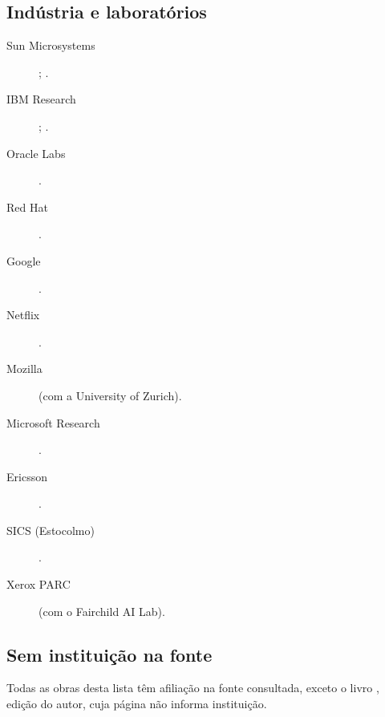 \subsection{Indústria e laboratórios}
\begin{description}
\item[Sun Microsystems] ;
  .
\item[IBM Research] ;
  .
\item[Oracle Labs] .
\item[Red Hat] .
\item[Google] .
\item[Netflix] .
\item[Mozilla]  (com a
  University of Zurich).
\item[Microsoft Research] .
\item[Ericsson] .
\item[SICS (Estocolmo)] .
\item[Xerox PARC]  (com o
  Fairchild AI Lab).
\end{description}

\subsection{Sem instituição na fonte}
Todas as obras desta lista têm afiliação na fonte consultada, exceto o
livro  \pt, edição do autor, cuja página não
informa instituição.
\endgroup
